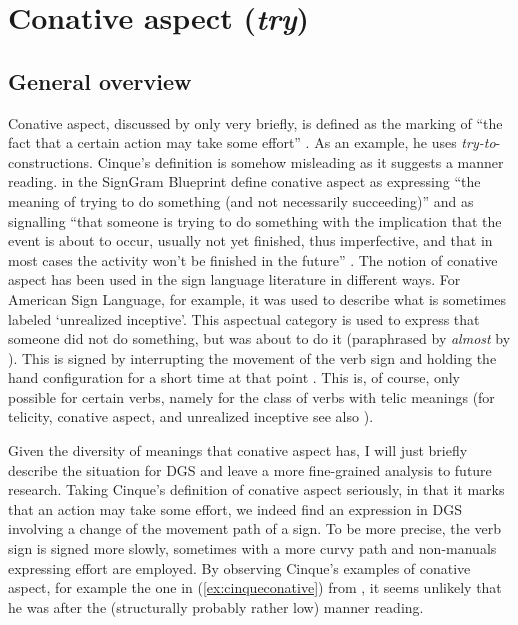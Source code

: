 \section{Conative aspect (\textit{try})}\label{conative}
\subsection{General overview}
Conative aspect, discussed by \citet{cinque1999adverbs, cinque2006restructuring} only very briefly, is defined as the marking of ``the fact that a certain action may take some effort'' \citep[105]{cinque1999adverbs}. As an example, he uses \textit{try-to}-constructions. Cinque's definition is somehow misleading as it suggests a manner reading. \citet[568]{signgram2017} in the SignGram Blueprint define conative aspect as expressing ``the meaning of trying to do something (and not necessarily succeeding)'' and as signalling ``that someone is trying to do something with the implication that the event is about to occur, usually not yet finished, thus imperfective, and that in most cases the activity won't be finished in the future'' \citep[225--226]{signgram2017}. The notion of conative aspect has been used in the sign language literature in different ways. For American Sign Language, for example, it was used to describe what is sometimes labeled `unrealized inceptive'. This aspectual category is used to express that someone did not do something, but was about to do it (paraphrased by \textit{almost} by \citealt{wilbur2010semantics}). This is signed by interrupting the movement of the verb sign and holding the hand configuration for a short time at that point \citep{liddell1984unrealized, rathmann2005event}. This is, of course, only possible for certain verbs, namely for the class of verbs with telic meanings (for telicity, conative aspect, and unrealized inceptive see also \citealt{wilbur1987american, brentari1998prosodic, wilbur2008complex, wilbur2010semantics}).

Given the diversity of meanings that conative aspect has, I will just briefly describe the situation for DGS and leave a more fine-grained analysis to future research. Taking Cinque's definition of conative aspect seriously, in that it marks that an action may take some effort, we indeed find an expression in DGS involving a change of the movement path of a sign. To be more precise, the verb sign is signed more slowly, sometimes with a more curvy path and non-manuals expressing effort are employed. By observing Cinque's examples of conative aspect, for example the one in (\ref{ex:cinqueconative}) from \citet[143]{cinque2001restructuring}, it seems unlikely that he was after the (structurally probably rather low) manner reading.

